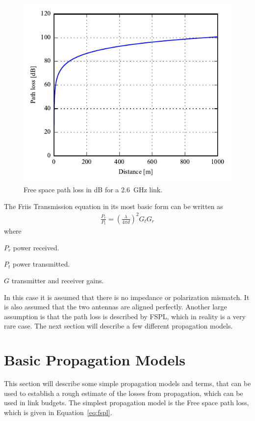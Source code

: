 \begin{figure}[htbp]
  \centering
  \includegraphics{img/analysis/distancePathloss}
  \caption{Free space path loss in dB for a \SI{2.6}{GHz} link.}
  \label{fig:fspl-plot}
\end{figure}

The Friis Transmission equation in its most basic form can be written as \cite{balanis2012antenna} 
\begin{align}
    \frac{P_r}{P_t} = \left( \frac{\lambda}{4 \pi d} \right)^2 G_{t} G_{r} 
\end{align}
where
\begin{where} 
\item[$P_r$] power received.
\item[$P_t$] power transmitted.
\item[$G$] transmitter and receiver gains.
\end{where}
In this case it is assumed that there is no impedance or polarization mismatch. It is also assumed that the two antennas are aligned perfectly. Another large assumption is that the path loss is described by FSPL, which in reality is a very rare case. The next section will describe a few different propagation models.

\section{Basic Propagation Models}
\label{sec:propmodels}
This section will describe some simple propagation models and terms, that can be used to establish a rough estimate of the losses from propagation, which can be used in link budgets. The simplest propagation model is the Free space path loss, which is given in Equation~\ref{eq:fspl}.

